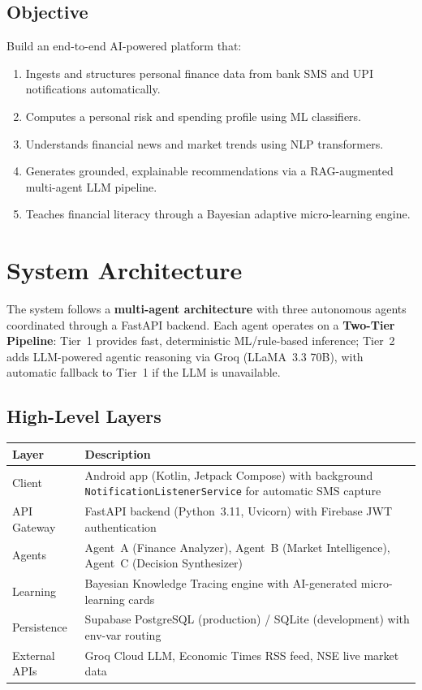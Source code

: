 \documentclass[12pt,a4paper]{article}
\begin{document}
\subsection{Objective}
Build an end-to-end AI-powered platform that:
\begin{enumerate}[leftmargin=1.5em]
  \item Ingests and structures personal finance data from bank SMS and UPI notifications automatically.
  \item Computes a personal risk and spending profile using ML classifiers.
  \item Understands financial news and market trends using NLP transformers.
  \item Generates grounded, explainable recommendations via a RAG-augmented multi-agent LLM pipeline.
  \item Teaches financial literacy through a Bayesian adaptive micro-learning engine.
\end{enumerate}

\newpage
\section{System Architecture}

The system follows a \textbf{multi-agent architecture} with three autonomous agents coordinated through a FastAPI backend. Each agent operates on a \textbf{Two-Tier Pipeline}: Tier~1 provides fast, deterministic ML/rule-based inference; Tier~2 adds LLM-powered agentic reasoning via Groq (LLaMA~3.3 70B), with automatic fallback to Tier~1 if the LLM is unavailable.

\subsection{High-Level Layers}

\begin{table}[h!]
\centering
\begin{tabularx}{\textwidth}{l X}
\toprule
\textbf{Layer} & \textbf{Description} \\
\midrule
Client        & Android app (Kotlin, Jetpack Compose) with background \texttt{NotificationListenerService} for automatic SMS capture \\
API Gateway   & FastAPI backend (Python~3.11, Uvicorn) with Firebase JWT authentication \\
Agents        & Agent~A (Finance Analyzer), Agent~B (Market Intelligence), Agent~C (Decision Synthesizer) \\
Learning      & Bayesian Knowledge Tracing engine with AI-generated micro-learning cards \\
Persistence   & Supabase PostgreSQL (production) / SQLite (development) with env-var routing \\
External APIs & Groq Cloud LLM, Economic Times RSS feed, NSE live market data \\
\bottomrule
\end{tabularx}
\end{table}
\end{document}
